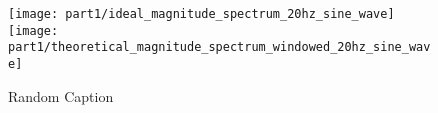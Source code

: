 \begin{figure}[H]
\centering{}
\texttt{[image: part1/ideal\_magnitude\_spectrum\_20hz\_sine\_wave]}
\texttt{[image: part1/theoretical\_magnitude\_spectrum\_windowed\_20hz\_sine\_wave]}
\caption{Random Caption}
\end{figure}
